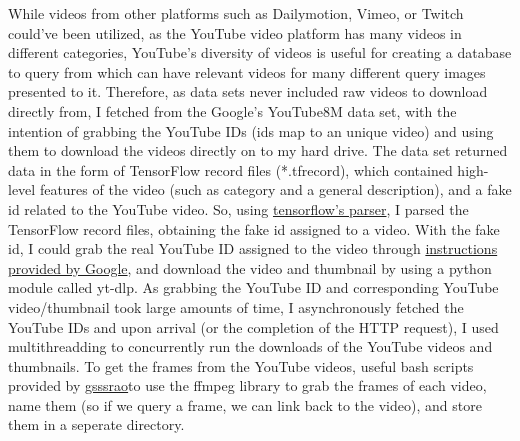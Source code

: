 \documentclass[10pt,twocolumn]{article}
\begin{document}
While videos from other platforms such as Dailymotion, Vimeo, or Twitch could've been utilized, as the YouTube video platform has many videos in different categories, YouTube's diversity of videos is useful for creating a database to query from which can have relevant videos for many different query images presented to it. Therefore, as data sets never included raw videos to download directly from, I fetched from the Google's YouTube8M data set, with the intention of grabbing the YouTube IDs (ids map to an unique video) and using them to download the videos directly on to my hard drive. The data set returned data in the form of TensorFlow record files (*.tfrecord), which contained high-level features of the video (such as category and a general description), and a fake id related to the YouTube video. So, using \href{https://www.tensorflow.org/api_docs/python/tf/io}{tensorflow's parser}, I parsed the TensorFlow record files, obtaining the fake id assigned to a video. With the fake id, I could grab the real YouTube ID assigned to the video through \href{https://research.google.com/youtube8m/video_id_conversion.html}{instructions provided by Google}, and download the video and thumbnail by using a python module called yt-dlp. As grabbing the YouTube ID and corresponding YouTube video/thumbnail took large amounts of time, I asynchronously fetched the YouTube IDs and upon arrival (or the completion of the HTTP request), I used multithreadding to concurrently run the downloads of the YouTube videos and thumbnails. To get the frames from the YouTube videos, useful bash scripts provided by \href{https://github.com/gsssrao/youtube-8m-videos-frames}{gsssrao}to use the ffmpeg library to grab the frames of each video, name them (so if we query a frame, we can link back to the video), and store them in a seperate directory.
\end{document}
